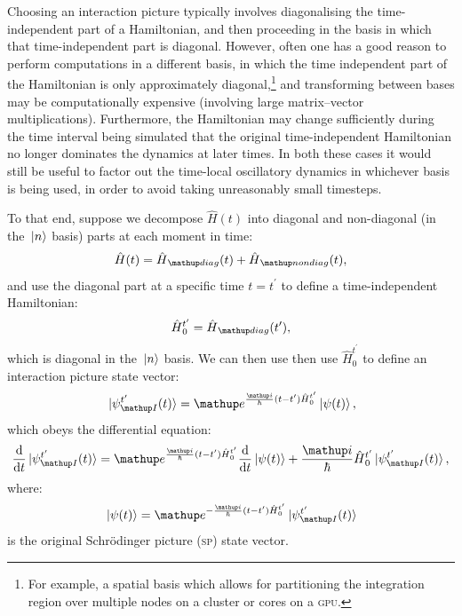Choosing an interaction picture typically involves diagonalising the time-independent part of a Hamiltonian, and then proceeding in the basis in which that time-independent part is diagonal. However, often one has a good reason to perform computations in a different basis, in which the time independent part of the Hamiltonian is only approximately diagonal,\footnote{For example, a spatial basis which allows for partitioning the integration region over multiple nodes on a cluster or cores on a \textsc{gpu}.} and transforming between bases may be computationally expensive (involving large matrix--vector multiplications). Furthermore, the Hamiltonian may change sufficiently during the time interval being simulated that the original time-independent Hamiltonian no longer dominates the dynamics at later times. In both these cases it would still be useful to factor out the time-local oscillatory dynamics in whichever basis is being used, in order to avoid taking unreasonably small timesteps.

To that end, suppose we decompose $\hat H(t)$ into diagonal and non-diagonal (in the $\ket{n}$ basis) parts at each moment in time:
\begin{align}
\hat H(t) = \hat H_\up{diag}(t) + \hat H_\up{nondiag}(t),
\end{align}
and use the diagonal part at a specific time $t=t^\prime$ to define a time-independent Hamiltonian:
\begin{align}\label{eq:H0def}
 \hat H_0^{t^\prime} = \hat H_\up{diag}(t^\prime),
\end{align}
which is diagonal in the $\ket{n}$ basis. We can then use then use $\hat H_0^{t^\prime}$ to define an interaction picture state vector:
\begin{align}\label{eq:IP_definition}
\ket{\psi_\up{I}^{t^\prime}(t)} = \ee^{\frac \ii \hbar (t - t^\prime) \hat H_0^{t^\prime}}\ket{\psi(t)},
\end{align}
which obeys the differential equation:
\begin{align}\label{eq:IPDE}
\dv t \ket{\psi_\up{I}^{t^\prime}(t)}
    = \ee^{\frac \ii \hbar (t - t^\prime) \hat H_0^{t^\prime}}\dv t \ket{\psi(t)}
      + \frac \ii\hbar \hat H_0^{t^\prime}\ket{\psi_\up{I}^{t^\prime}(t)},
\end{align}
where:
\begin{align}\label{eq:backtransform}
\ket{\psi(t)} = \ee^{-\frac \ii \hbar (t - t^\prime) \hat H_0^{t^\prime}}\ket{\psi_\up{I}^{t^\prime}(t)}
\end{align}
is the original Schr\"odinger picture (\textsc{sp}) state vector.

